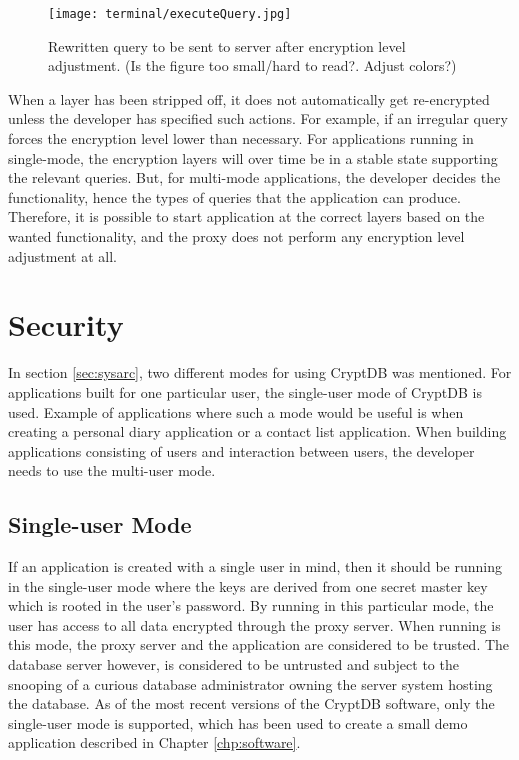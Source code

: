 \begin{figure}[h]
	\texttt{[image: terminal/executeQuery.jpg]}
	\caption{Rewritten query to be sent to server after encryption level adjustment. (Is the figure too small/hard to read?. Adjust colors?)}
	\label{rewritten_query}
\end{figure}

When a layer has been stripped off, it does not automatically get re-encrypted unless the developer has specified such actions. For example, if an irregular query forces the encryption level lower than necessary. For applications running in single-mode, the encryption layers will over time be in a stable state supporting the relevant queries. But, for multi-mode applications, the developer decides the functionality, hence the types of queries that the application can produce. Therefore, it is possible to start application at the correct layers based on the wanted functionality, and the proxy does not perform any encryption level adjustment at all.



\section{Security}

In section \ref{sec:sysarc}, two different modes for using CryptDB was mentioned. For applications built for one particular user, the single-user mode of CryptDB is used. Example of applications where such a mode would be useful is when creating a personal diary application or a contact list application. When building applications consisting of users and interaction between users, the developer needs to use the multi-user mode.

\subsection{Single-user Mode}
If an application is created with a single user in mind, then it should be running in the single-user mode where the keys are derived from one secret master key which is rooted in the user's password. By running in this particular mode, the user has access to all data encrypted through the proxy server. When running is this mode, the proxy server and the application are considered to be trusted. The database server however, is considered to be untrusted and subject to the snooping of a curious database administrator owning the server system hosting the database. As of the most recent versions of the CryptDB software, only the single-user mode is supported, which has been used to create a small demo application described in Chapter \ref{chp:software}.

